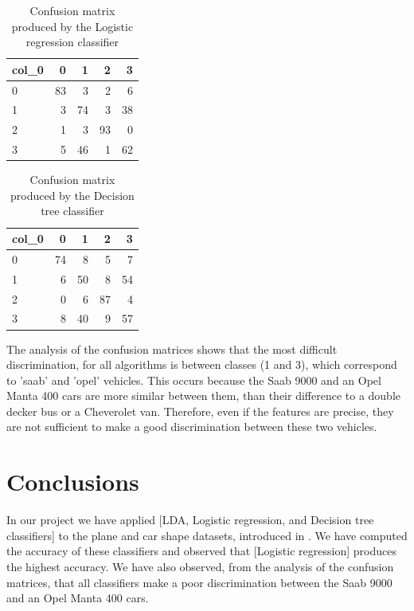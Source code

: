 \documentclass{article} %
\begin{document}
\begin{table}
\centering
\begin{tabular}{lrrrr}
\toprule\hline
col\_0 &   0 &   1 &   2 &   3 \\\hline
0     &  83 &   3 &   2 &   6 \\\hline
1     &   3 &  74 &   3 &  38 \\\hline
2     &   1 &   3 &  93 &   0 \\\hline
3     &   5 &  46 &   1 &  62 \\\hline
\bottomrule \hline
\end{tabular}
\caption{Confusion matrix produced by the Logistic regression classifier}
 \label{tab:CM_LG}
\end{table}

\begin{table}
\centering
\begin{tabular}{lrrrr}
\toprule \hline
col\_0 &   0 &   1 &   2 &   3 \\\hline
0     &  74 &   8 &   5 &   7 \\\hline
1     &   6 &  50 &   8 &  54 \\\hline
2     &   0 &   6 &  87 &   4 \\\hline
3     &   8 &  40 &   9 &  57 \\\hline
\bottomrule \hline
\end{tabular}
\caption{Confusion matrix produced by the Decision tree classifier}
 \label{tab:CM_DT}
\end{table}

The analysis of the confusion matrices shows that the most difficult discrimination, for all algorithms is between classes (1 and 3), which correspond to 'saab' and 'opel' vehicles. This occurs because the Saab 9000 and an Opel Manta 400 cars are more similar between them, than their difference to  a double decker bus or a  Cheverolet van. Therefore, even if the features are precise, they are not sufficient to make a good discrimination between these two vehicles. 

\section{Conclusions}
  In our project we have applied  [LDA, Logistic regression, and Decision tree classifiers] to the plane and car shape datasets, introduced in \cite{Thakoor:2007} \cite{Thakoor:2005-July} \cite{Thakoor:2005-Oct}. We have computed the accuracy of these classifiers and observed that [Logistic regression] produces the highest accuracy. We have also observed, from the analysis of the confusion matrices, that all classifiers make a poor discrimination between the Saab 9000 and an Opel Manta 400 cars. 


 
 
\end{document}
